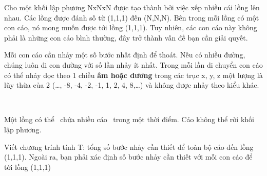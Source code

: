Cho một khối lập phương NxNxN được tạo thành bởi việc xếp nhiều cái lồng lên nhau. Các lồng được đánh số từ (1,1,1) đến (N,N,N). Bên trong mỗi lồng có một con cáo, nó mong muốn được tới lồng (1,1,1). Tuy nhiên, các con cáo này không phải là những con cáo bình thường, đây trở thành vấn đề bạn cần giải quyết.

Mỗi con cáo cần nhảy một số bước nhất định để thoát. Nếu có nhiều đường, chúng luôn đi con đường với số lần nhảy ít nhất. Trong mỗi lần di chuyển con cáo có thể nhảy dọc theo 1 chiều \textbf{ âm hoặc dương } trong các trục x, y, z một lượng là lũy thừa của 2 (…, -8, -4, -2, -1, 1, 2, 4, 8,…) và không được nhảy theo kiểu khác.

 

Một lồng có thể  chứa nhiều cáo  trong một thời điểm. Cáo không thể rời khối lập phương.

Viết chương trính tính T: tổng số bước nhảy cần thiết để toàn bộ cáo đến lồng (1,1,1). Ngoài ra, bạn phải xác định số bước nhảy cần thiết với mỗi con cáo để tới lồng (1,1,1)